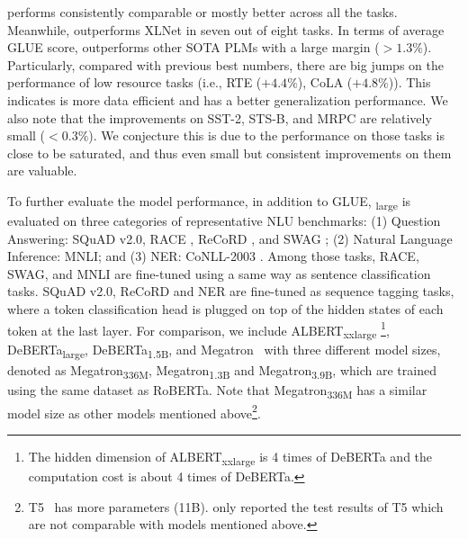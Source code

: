 {\ModelName} performs consistently comparable or mostly better across all the tasks. Meanwhile, {\ModelName} outperforms XLNet in seven out of eight tasks. In terms of average GLUE score, {\ModelName} outperforms other SOTA PLMs with a large margin ($>1.3\%$). Particularly, compared with previous best numbers, there are big jumps on the performance of low resource tasks (i.e., RTE ($+4.4\%$), CoLA ($+4.8\%$)). This indicates {\ModelName} is more data efficient and has a better generalization performance. We also note that the improvements on SST-2, STS-B, and MRPC are relatively small ($<0.3\%$). We conjecture this is due to the performance on those tasks is close to be saturated, and thus even small but consistent improvements on them are valuable. 

To further evaluate the model performance, in addition to GLUE, \ModelName\textsubscript{large} is evaluated on three categories of representative NLU benchmarks: (1) Question Answering: SQuAD v2.0, RACE \citep{lai2017race}, ReCoRD \citep{zhang2018record}, and SWAG \citep{zellers2018swag}; (2) Natural Language Inference: MNLI; and (3) NER: CoNLL-2003 \citep{sang2003conll2003}. Among those tasks, RACE, SWAG, and MNLI are fine-tuned using a same way as sentence classification tasks. SQuAD v2.0, ReCoRD and NER are fine-tuned as sequence tagging tasks,  where a token classification head is plugged on top of the hidden states of each token at the last layer. For comparison, we include 
ALBERT\textsubscript{xxlarge}
\footnote{ The hidden dimension of ALBERT\textsubscript{xxlarge} is 4 times of DeBERTa and the computation cost is about 4 times of DeBERTa.}, DeBERTa\textsubscript{large}, DeBERTa\textsubscript{1.5B}, and Megatron~\citep{shoeybi2019megatron} with three different model sizes, denoted as Megatron\textsubscript{336M}, Megatron\textsubscript{1.3B} and Megatron\textsubscript{3.9B}, which are trained using the same dataset as RoBERTa. Note that Megatron\textsubscript{336M} has a similar model size as other models mentioned above\footnote{T5~\citep{raffel2019t5} has more parameters (11B). \cite{raffel2019t5} only reported the test results of T5 which are not comparable with models mentioned above.}. 

